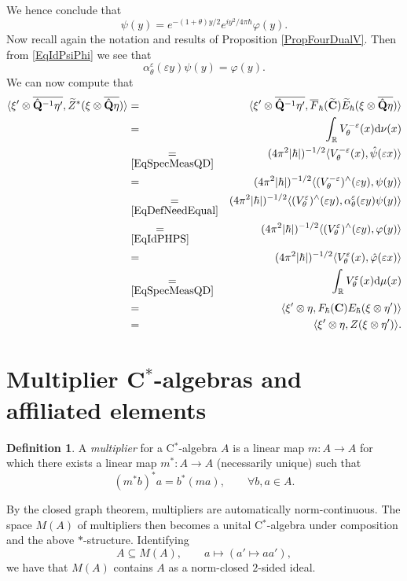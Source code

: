 \documentclass[11pt, reqno]{amsart}
\theoremstyle{definition}
\newtheorem{defn}[theorem]{Definition}
\numberwithin{equation}{section}
\def\R{\mathbb R}
\newcommand{\Qb}{\mathbf{Q}}
\newcommand{\rd}{\mathrm{d}\!\,}
\newcommand{\Cb}{\mathbf{C}}
\begin{document}
We hence conclude that 
\begin{equation}\label{EqIdPsiPhi}
\psi(y) = e^{-(1+\theta) y/2}e^{iy^2/4\pi\hbar}\varphi(y). 
\end{equation}
Now recall again the notation and results of Proposition \ref{PropFourDualV}. Then from \eqref{EqIdPsiPhi} we see that  
\begin{equation}\label{EqIdPHPS}
\alpha_{\theta}^{\varepsilon}(\varepsilon y) \psi(y) = \varphi(y).
\end{equation}
We can now compute that 
\begin{eqnarray*}
\langle \xi'\otimes \overline{\hat{\Qb}^{-1}\eta'},\widetilde{Z}^*(\xi\otimes \overline{\hat{\Qb}\eta})\rangle &=& 
\langle \xi'\otimes \overline{\hat{\Qb}^{-1}\eta'}, \overline{F}_{\hbar}(\widetilde{\Cb}) \widetilde{E}_{\hbar}(\xi\otimes \overline{\hat{\Qb}\eta})\rangle \\
&=& \int_{\R} V_{\theta}^{-\varepsilon}(x)\rd \nu(x)
\\
&\underset{\eqref{EqSpecMeasQD}}{=}& (4\pi^2|\hbar|)^{-1/2}\langle V_{\theta}^{-\varepsilon}(x),\hat{\psi}(\varepsilon x)\rangle
\\
&=& (4\pi^2|\hbar|)^{-1/2}\langle (V^{-\varepsilon}_{\theta})^{\wedge}(\varepsilon y),\psi(y)\rangle \\
&\underset{\eqref{EqDefNeedEqual}}{=}&  (4\pi^2|\hbar|)^{-1/2}\langle (V^{\varepsilon}_{\theta})^{\wedge}(\varepsilon y),\alpha_{\theta}^{\varepsilon}(\varepsilon y)\psi(y)\rangle \\
&\underset{\eqref{EqIdPHPS}}{=}&  (4\pi^2|\hbar|)^{-1/2} \langle (V_{\theta}^{\varepsilon})^{\wedge}(\varepsilon y),\varphi(y)\rangle \\
&=&  (4\pi^2|\hbar|)^{-1/2} \langle V_{\theta}^{\varepsilon}(x),\hat{\varphi}(\varepsilon x)\rangle \\
&\underset{\eqref{EqSpecMeasQD}}{=}& \int_{\R} V_{\theta}^{\varepsilon}(x)\rd \mu (x)\\ 
&=&  \langle \xi'\otimes \eta,F_{\hbar}(\Cb) E_{\hbar}(\xi\otimes \eta')\rangle \\
&=&  \langle \xi'\otimes \eta,Z(\xi\otimes \eta')\rangle.
\end{eqnarray*}



\section{Multiplier  \texorpdfstring{C$^*$-algebras}{C*-algebras} and affiliated elements}\label{SecMult}
\begin{defn}
A \emph{multiplier} for a C$^*$-algebra $A$ is a linear map $m\colon  A \rightarrow A$ for which there exists a linear map $m^*\colon  A \rightarrow A$ (necessarily unique) such that 
\[
(m^*b)^* a = b^*(ma),\qquad \forall b,a \in A. 
\]
\end{defn}
By the closed graph theorem, multipliers are automatically norm-continuous. The space $M(A)$ of multipliers then becomes a unital C$^*$-algebra under composition and the above $*$-structure. Identifying 
\[
A \subseteq M(A),\qquad a \mapsto (a' \mapsto aa'),
\]
we have that $M(A)$ contains $A$ as a norm-closed $2$-sided ideal.
\end{document}

